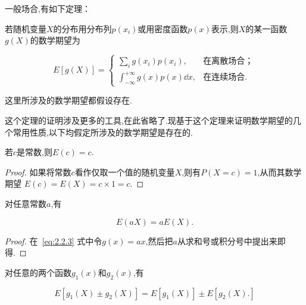 一般场合,有如下定理：
\begin{theorem}{}{}
	若随机变量$ X $的分布用分布列$ p(x_i) $或用密度函数$ p(x) $表示,则$ X $的某一函数$ g(X) $的数学期望为
	
	\begin{equation}\label{eq:2.2.3}
	E[g(X)] = \begin{cases}
	  \sum_{i} g\left(x_{i}\right) p\left(x_{i}\right), & \text{在离散场合；} \\
      \int_{-\infty}^{+\infty} g(x) p(x) \dd  x, & \text{在连续场合.}
	\end{cases}
	\end{equation}
	
	这里所涉及的数学期望都假设存在.
	
	这个定理的证明涉及更多的工具,在此省略了.现基于这个定理来证明数学期望的几个常用性质,以下均假定所涉及的数学期望是存在的.
	
\end{theorem}

\begin{property}
	
	若$ c $是常数,则$ E(c)=c $.
	
\end{property}

\begin{proof}
	如果将常数$ c $看作仅取一个值的随机变量$ X $,则有$ P(X=c)=1 $,从而其数学期望 $ E(c)=E(X)=c \times 1=c $.
\end{proof}

\begin{property}
	对任意常数$ a $,有
	
	\begin{equation}
	E ( a X ) = a E ( X ). \label{eq:2.2.4}
	\end{equation}
	
\end{property}

\begin{proof}
	在~\ref{eq:2.2.3} 式中令$ g(x)=ax $,然后把$ a $从求和号或积分号中提出来即得.
\end{proof}

\begin{property}
	对任意的两个函数$ g_1(x) $和$ g_2(x) $,有
	
	\begin{equation}
	E \left[ g _ { 1 } ( X ) \pm g _ { 2 } ( X ) \right] = E \left[ g _ { 1 } ( X ) \right] \pm E \left[ g _ { 2 } ( X ) . \right] \label{eq:2.2.5}
	\end{equation}
	
\end{property}

